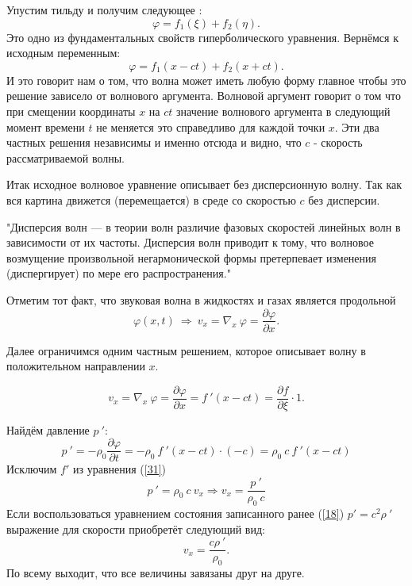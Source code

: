 \documentclass[14pt,a4paper,oneside]{extarticle}	%
\begin{document}
Упустим тильду и получим следующее :
\begin{equation*}
\varphi = f_{1}(\xi) + f_{2}(\eta).
\end{equation*}
Это одно из фундаментальных свойств гиперболического уравнения.
Вернёмся к исходным переменным:
\begin{equation}\label{29}
\varphi = f_{1}(x-ct) + f_{2}(x+ct).
\end{equation}
И это говорит нам о том, что волна может иметь любую форму главное чтобы это решение зависело от волнового аргумента.
Волновой аргумент говорит о том что при смещении координаты $ x $ на $ ct $ значение волнового аргумента в следующий момент времени $ t $ не меняется это справедливо для каждой точки $ x $.
Эти два частных решения независимы и именно отсюда и видно, что $ c $ - скорость рассматриваемой волны.

Итак исходное волновое уравнение описывает без дисперсионную волну. Так как вся картина движется (перемещается) в среде со скоростью $ c $ без дисперсии.
 
"Дисперсия волн — в теории волн различие фазовых скоростей линейных волн в зависимости от их частоты. Дисперсия волн приводит к тому, что волновое возмущение произвольной негармонической формы претерпевает изменения (диспергирует) по мере его распространения."

Отметим тот факт, что звуковая волна в жидкостях и газах является продольной 
\begin{equation}\label{30}
\varphi(x,t) \: \Rightarrow \: v_{x}=\nabla_{x}\: \varphi = \frac{\partial \varphi}{\partial x}.
\end{equation}

Далее ограничимся одним частным решением, которое описывает волну в положительном направлении $ x $.

\begin{equation}\label{31}
 v_{x}=\nabla_{x}\: \varphi = \frac{\partial \varphi}{\partial x}= f\:'(x-ct) = \frac{\partial f}{\partial \xi} \cdot 1.
\end{equation}

Найдём давление $p\:'$:
\begin{equation}\label{32}
p\:' = - \rho_{0} \frac{\partial \varphi}{\partial t} =  - \rho_{0} \:f\:'(x-ct)\cdot(-c) = \rho_{0}\:c \:f\:'(x-ct)
\end{equation}
Исключим $ f' $ из уравнения (\ref{31})
\begin{equation*}
p\:' = \rho_{0}\:c \: v_{x} \Rightarrow  v_{x} = \frac{p\:'}{\rho_{0}\:c}
\end{equation*}
Если воспользоваться уравнением состояния записанного ранее (\ref{18}) $ p' = c^{2}  \rho\:' $ выражение для скорости приобретёт следующий вид:
\begin{equation*}
v_{x}= \frac{c \rho\:'}{\rho_{0}}.
\end{equation*}
По всему выходит, что все величины завязаны друг на друге.
\end{document}
